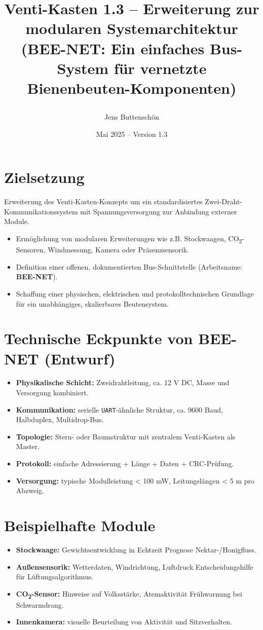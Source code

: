 \documentclass[11pt,a4paper]{article}
\title{\parbox{\linewidth}{\centering\textbf{
Venti-Kasten 1.3 -- Erweiterung zur modularen Systemarchitektur\\
(BEE-NET: Ein einfaches Bus-System f\"ur vernetzte Bienenbeuten-Komponenten)}}}
\author{Jens Buttensch\"on}
\date{Mai 2025 -- Version 1.3}
\begin{document}
\maketitle

\section*{Zielsetzung}
Erweiterung des Venti-Kasten-Konzepts um ein standardisiertes Zwei-Draht-Kommunikationssystem mit Spannungsversorgung zur Anbindung externer Module.
\begin{itemize}
  \item Erm\"oglichung von modularen Erweiterungen wie z.B. Stockwaagen, CO\textsubscript{2}-Sensoren, Windmessung, Kamera oder Pr\"asenzsensorik.
  \item Definition einer offenen, dokumentierten Bus-Schnittstelle (Arbeitsname: \textbf{BEE-NET}).
  \item Schaffung einer physischen, elektrischen und protokolltechnischen Grundlage f\"ur ein unabh\"angiges, skalierbares Beutensystem.
\end{itemize}

\section{Technische Eckpunkte von BEE-NET (Entwurf)}
\begin{itemize}
  \item \textbf{Physikalische Schicht:} Zweidrahtleitung, ca. 12 V DC, Masse und Versorgung kombiniert.
  \item \textbf{Kommunikation:} serielle \texttt{UART}-\"ahnliche Struktur, ca. 9600 Baud, Halbduplex, Multidrop-Bus.
  \item \textbf{Topologie:} Stern- oder Baumstruktur mit zentralem Venti-Kasten als Master.
  \item \textbf{Protokoll:} einfache Adressierung + L\"ange + Daten + CRC-Pr\"ufung.
  \item \textbf{Versorgung:} typische Modulleistung < 100 mW, Leitungsl\"angen < 5 m pro Abzweig.
\end{itemize}

\section{Beispielhafte Module}
\begin{itemize}
  \item \textbf{Stockwaage:} Gewichtsentwicklung in Echtzeit \textrightarrow{} Prognose Nektar-/Honigfluss.
  \item \textbf{Au\ss{}ensensorik:} Wetterdaten, Windrichtung, Luftdruck \textrightarrow{} Entscheidungshilfe f\"ur L\"uftungsalgorithmus.
  \item \textbf{CO\textsubscript{2}-Sensor:} Hinweise auf Volksst\"arke, Atemaktivit\"at \textrightarrow{} Fr\"uhwarnung bei Schwarmdrang.
  \item \textbf{Innenkamera:} visuelle Beurteilung von Aktivit\"at und Sitzverhalten.
\end{itemize}
\end{document}
